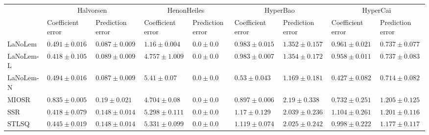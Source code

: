 \begin{table*}
{\begin{tabular}{lllllllll}
 & \multicolumn{2}{c}{Halvorsen} & \multicolumn{2}{c}{HenonHeiles} & \multicolumn{2}{c}{HyperBao} & \multicolumn{2}{c}{HyperCai} \\
 & Coefficient error & Prediction error & Coefficient error & Prediction error & Coefficient error & Prediction error & Coefficient error & Prediction error \\
\midrule
LaNoLem & $0.491\pm 0.016$ & $\mathbf{0.087}\pm 0.009$ & $\mathbf{1.16}\pm 0.004$ & $0.0\pm 0.0$ & $0.983\pm 0.015$ & $1.352\pm 0.157$ & $0.961\pm 0.021$ & $0.737\pm 0.077$ \\
LaNoLem-L & $\mathbf{0.418}\pm 0.105$ & $0.089\pm 0.009$ & $4.757\pm 1.009$ & $0.0\pm 0.0$ & $0.983\pm 0.007$ & $1.354\pm 0.172$ & $0.958\pm 0.011$ & $0.737\pm 0.083$ \\
LaNoLem-N & $0.494\pm 0.016$ & $0.087\pm 0.009$ & $5.41\pm 0.07$ & $\mathbf{0.0}\pm 0.0$ & $\mathbf{0.53}\pm 0.043$ & $\mathbf{1.169}\pm 0.181$ & $\mathbf{0.427}\pm 0.082$ & $\mathbf{0.714}\pm 0.082$ \\
MIOSR & $0.835\pm 0.005$ & $0.19\pm 0.021$ & $4.704\pm 0.08$ & $0.0\pm 0.0$ & $0.897\pm 0.006$ & $2.19\pm 0.338$ & $0.732\pm 0.251$ & $1.205\pm 0.125$ \\
SSR & $0.418\pm 0.079$ & $0.148\pm 0.014$ & $5.298\pm 0.111$ & $0.0\pm 0.0$ & $1.17\pm 0.129$ & $2.039\pm 0.236$ & $1.104\pm 0.261$ & $1.201\pm 0.116$ \\
STLSQ & $0.445\pm 0.019$ & $0.148\pm 0.014$ & $5.331\pm 0.099$ & $0.0\pm 0.0$ & $1.119\pm 0.074$ & $2.025\pm 0.242$ & $0.998\pm 0.222$ & $1.177\pm 0.117$ \\

\midrule


\end{tabular}}
\end{table*}
